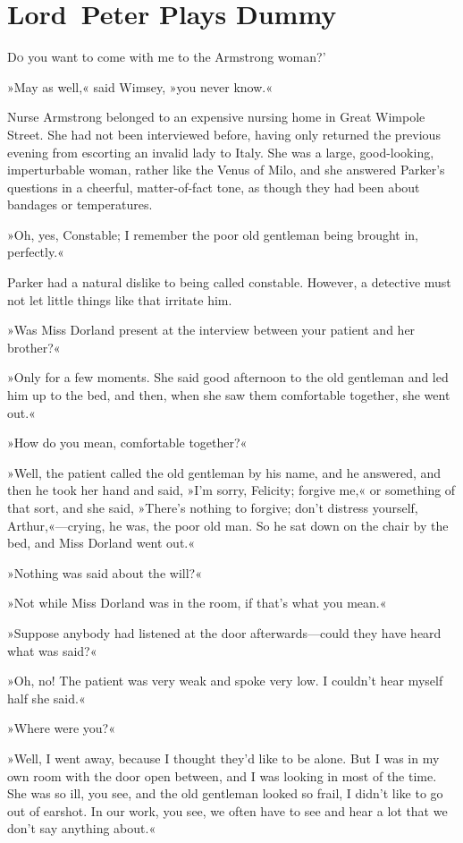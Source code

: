 \chapter{Lord~Peter Plays Dummy}
\lettrine[lines=4,ante=‘]{D}{o} you want to come with me to the Armstrong woman?'

\zz
»May as well,« said Wimsey, »you never know.«

\zz
Nurse Armstrong belonged to an expensive nursing home in Great Wimpole Street. She had not been interviewed before, having only returned the previous evening from escorting an invalid lady to Italy. She was a large, good-looking, imperturbable woman, rather like the Venus of Milo, and she answered Parker's questions in a cheerful, matter-of-fact tone, as though they had been about bandages or temperatures.

»Oh, yes, Constable; I remember the poor old gentleman being brought in, perfectly.«

Parker had a natural dislike to being called constable. However, a detective must not let little things like that irritate him.

»Was Miss Dorland present at the interview between your patient and her brother?«

»Only for a few moments. She said good afternoon to the old gentleman and led him up to the bed, and then, when she saw them comfortable together, she went out.«

»How do you mean, comfortable together?«

»Well, the patient called the old gentleman by his name, and he answered, and then he took her hand and said, »I'm sorry, Felicity; forgive me,« or something of that sort, and she said, »There's nothing to forgive; don't distress yourself, Arthur,«—crying, he was, the poor old man. So he sat down on the chair by the bed, and Miss Dorland went out.«

»Nothing was said about the will?«

»Not while Miss Dorland was in the room, if that's what you mean.«

»Suppose anybody had listened at the door afterwards—could they have heard what was said?«

»Oh, no! The patient was very weak and spoke very low. I couldn't hear myself half she said.«

»Where were you?«

»Well, I went away, because I thought they'd like to be alone. But I was in my own room with the door open between, and I was looking in most of the time. She was so ill, you see, and the old gentleman looked so frail, I didn't like to go out of earshot. In our work, you see, we often have to see and hear a lot that we don't say anything about.«

